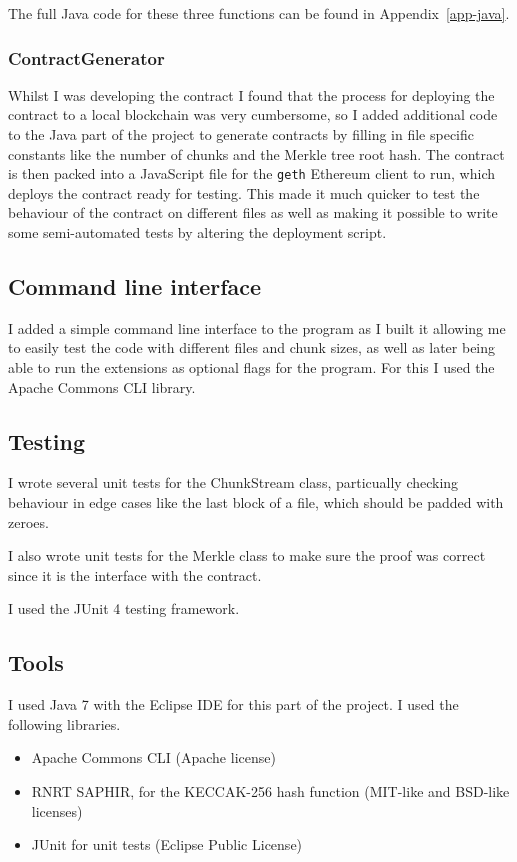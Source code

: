 \documentclass[12pt,a4paper,twoside,openright]{report}
\begin{document}
The full Java code for these three functions can be found in Appendix~\ref{app-java}.

\subsubsection{ContractGenerator}

Whilst I was developing the contract I found that the process for deploying the contract to a local blockchain was very cumbersome, so
I added additional code to the Java part of the project to generate contracts by filling in file specific constants like the number of chunks and the Merkle tree root hash.
The contract is then packed into a JavaScript file for the \texttt{geth} Ethereum client to run, which deploys the contract ready for testing.
This made it much quicker to test the behaviour of the contract on different files as well as making it possible to write some semi-automated tests by altering the deployment script.

\subsection{Command line interface}

I added a simple command line interface to the program as I built it allowing me to easily test the code with different files and chunk sizes,
as well as later being able to run the extensions as optional flags for the program.
For this I used the Apache Commons CLI library.

\subsection{Testing}

I wrote several unit tests for the ChunkStream class, particually checking behaviour in edge cases like the last block of a file, which should be padded with zeroes.

I also wrote unit tests for the Merkle class to make sure the proof was correct since it is the interface with the contract.

I used the JUnit 4 testing framework.

\subsection{Tools}

I used Java 7 with the Eclipse IDE for this part of the project.
I used the following libraries.
\begin{itemize}
\item Apache Commons CLI (Apache license)
\item RNRT SAPHIR, for the KECCAK-256 hash function (MIT-like and BSD-like licenses)
\item JUnit for unit tests (Eclipse Public License)
\end{itemize}
\end{document}
